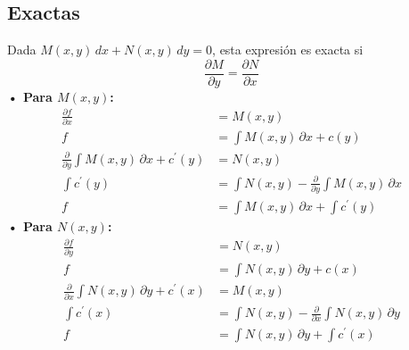 \documentclass[letterpaper, 12pt]{article}
\begin{document}
\begin{justify}
        \subsection*{Exactas}
        \justify
        Dada \(M(x,y)\, dx+N(x,y)\, dy=0\), esta expresión es exacta si 
        \[\frac{\partial M}{\partial y}=\frac{\partial N}{\partial x}\]
        \textbf{• Para \(M(x,y)\):}
        {\large\begin{equation*}
            \begin{aligned}
                \frac{\partial f}{\partial x}&=M(x,y)\\[5pt]
                f&=\int M(x,y)\, \partial x+c(y)\\[5pt]
                \frac{\partial}{\partial y}\int M(x,y)\, \partial x+c^{\prime}(y)&=N(x,y)\\[5pt]
                \int c^{\prime}(y)&=\int N(x,y)-\frac{\partial}{\partial y}\int M(x,y)\, \partial x\\[5pt]
                f&=\int M(x,y)\, \partial x+\int c^{\prime}(y)
            \end{aligned}
        \end{equation*}}
        \justify
        \textbf{• Para \(N(x,y)\):}
        {\large\begin{equation*}
            \begin{aligned}
                \frac{\partial f}{\partial y}&=N(x,y)\\[5pt]
                f&=\int N(x,y)\, \partial y+c(x)\\[5pt]
                \frac{\partial}{\partial x}\int N(x,y)\, \partial y+c^{\prime}(x)&=M(x,y)\\[5pt]
                \int c^{\prime}(x)&=\int N(x,y) -\frac{\partial}{\partial x}\int N(x,y)\, \partial y\\[5pt]
                f&=\int N(x,y)\, \partial y+\int c^{\prime}(x) 
            \end{aligned}
        \end{equation*}}

\end{justify}
\end{document}
